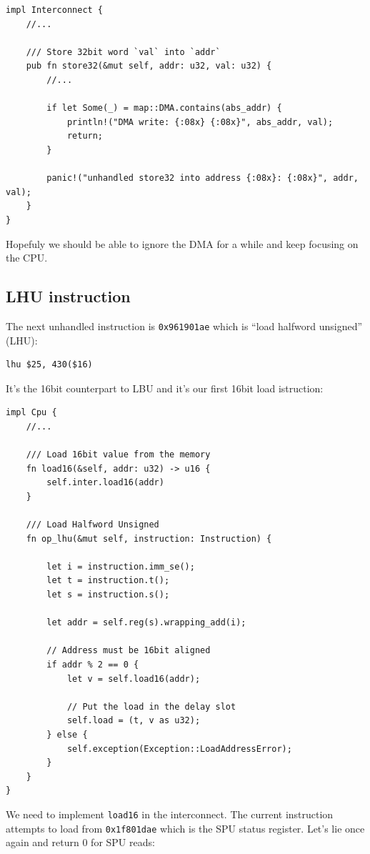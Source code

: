 \documentclass[a4paper]{article}
\newcommand{\code}[1] {\texttt{#1}}
\begin{document}
\begin{lstlisting}
impl Interconnect {
    //...

    /// Store 32bit word `val` into `addr`
    pub fn store32(&mut self, addr: u32, val: u32) {
        //...

        if let Some(_) = map::DMA.contains(abs_addr) {
            println!("DMA write: {:08x} {:08x}", abs_addr, val);
            return;
        }

        panic!("unhandled store32 into address {:08x}: {:08x}", addr, val);
    }
}
\end{lstlisting}

Hopefuly we should be able to ignore the DMA for a while and keep
focusing on the CPU.

\subsection{LHU instruction}

The next unhandled instruction is \code{0x961901ae} which is ``load
halfword unsigned'' (LHU):

\begin{lstlisting}[language=assembly]
lhu $25, 430($16)
\end{lstlisting}

It's the 16bit counterpart to LBU and it's our first 16bit load
istruction:

\begin{lstlisting}
impl Cpu {
    //...

    /// Load 16bit value from the memory
    fn load16(&self, addr: u32) -> u16 {
        self.inter.load16(addr)
    }

    /// Load Halfword Unsigned
    fn op_lhu(&mut self, instruction: Instruction) {

        let i = instruction.imm_se();
        let t = instruction.t();
        let s = instruction.s();

        let addr = self.reg(s).wrapping_add(i);

        // Address must be 16bit aligned
        if addr % 2 == 0 {
            let v = self.load16(addr);

            // Put the load in the delay slot
            self.load = (t, v as u32);
        } else {
            self.exception(Exception::LoadAddressError);
        }
    }
}
\end{lstlisting}

We need to implement \code{load16} in the interconnect. The current
instruction attempts to load from \code{0x1f801dae} which is the SPU
status register. Let's lie once again and return 0 for SPU reads:
\end{document}
